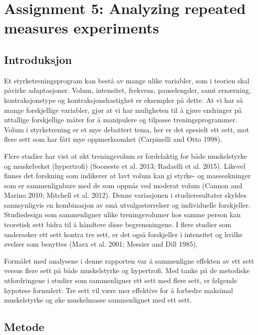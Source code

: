 \documentclass[
  letterpaper,
  DIV=11,
  numbers=noendperiod]{scrreprt}
\begin{document}

\chapter{Assignment 5: Analyzing repeated measures
experiments}\label{assignment-5-analyzing-repeated-measures-experiments}

\section{Introduksjon}\label{introduksjon-4}

Et styrketreningsprogram kan bestå av mange ulike variabler, som i
teorien skal påvirke adaptasjoner. Volum, intensitet, frekvens,
pauselengder, samt ernærning, kontraksjonstype og kontraksjonshastighet
er eksempler på dette. At vi har så mange forskjellige variabler, gjør
at vi har muligheten til å gjøre endringer på uttallige forskjellige
måter for å manipulere og tilpasse treningsprogrammer. Volum i
styrketrening er et mye debattert tema, her er det spesielt ett sett,
mot flere sett som har fått mye oppmerksomhet (Carpinelli and Otto
1998).

Flere studier har vist at økt treningsvolum er fordelaktig for både
muskelstyrke og muskelvekst (hypertrofi) (Sooneste et al. 2013; Radaelli
et al. 2015). Likevel finnes det forskning som indikerer at lavt volum
kan gi styrke- og masseøkninger som er sammenlignbare med de som oppnås
ved moderat volum (Cannon and Marino 2010; Mitchell et al. 2012). Denne
variasjonen i studieresultater skyldes sannsynligvis en kombinasjon av
små utvalgsstørrelser og individuelle forskjeller. Studiedesign som
sammenligner ulike treningsvolumer hos samme person kan teoretisk sett
bidra til å håndtere disse begrensningene. I flere studier som
undersøker ett sett kontra tre sett, er det også forskjeller i
intensitet og hvilke øvelser som benyttes (Marx et al. 2001; Messier and
Dill 1985).

Formålet med analysene i denne rapporten var å sammenligne effekten av
ett sett versus flere sett på både muskelstyrke og hypertrofi. Med tanke
på de metodiske utfordringene i studier som sammenligner ett sett med
flere sett, er følgende hypotese formulert: Tre sett vil være mer
effektive for å forbedre maksimal muskelstyrke og øke muskelmasse
sammenlignet med ett sett.

\section{Metode}\label{metode-5}
\end{document}
